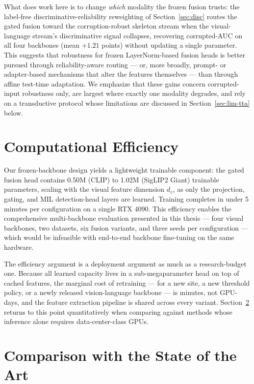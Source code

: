 What does work here is to change \emph{which} modality the frozen fusion
trusts: the label-free discriminative-reliability reweighting of
Section~\ref{sec:disc} routes the gated fusion toward the corruption-robust
skeleton stream when the visual-language stream's discriminative signal
collapses, recovering corrupted-AUC on all four backbones (mean $+1.21$
points) without updating a single parameter. This suggests that robustness for
frozen LayerNorm-based fusion heads is better pursued through
reliability-aware routing --- or, more broadly, prompt- or adapter-based
mechanisms that alter the features themselves --- than through affine
test-time adaptation. We emphasize that these gains concern corrupted-input
robustness only, are largest where exactly one modality degrades, and rely on
a transductive protocol whose limitations are discussed in
Section~\ref{sec:lim-tta} below.

\section{Computational Efficiency}
\label{sec:disc-efficiency}

Our frozen-backbone design yields a lightweight trainable component: the gated
fusion head contains 0.50M (CLIP) to 1.02M (SigLIP2 Giant) trainable
parameters, scaling with the visual feature dimension $d_v$, as only the
projection, gating, and MIL detection-head layers are learned. Training
completes in under 5 minutes per configuration on a single RTX 4090. This
efficiency enables the comprehensive multi-backbone evaluation presented in
this thesis --- four visual backbones, two datasets, six fusion variants, and
three seeds per configuration --- which would be infeasible with end-to-end
backbone fine-tuning on the same hardware.

The efficiency argument is a deployment argument as much as a research-budget
one. Because all learned capacity lives in a sub-megaparameter head on top of
cached features, the marginal cost of retraining --- for a new site, a new
threshold policy, or a newly released vision-language backbone --- is minutes,
not GPU-days, and the feature extraction pipeline is shared across every
variant. Section~\ref{sec:sota} returns to this point quantitatively when
comparing against methods whose inference alone requires data-center-class
GPUs.

\section{Comparison with the State of the Art}
\label{sec:sota}

